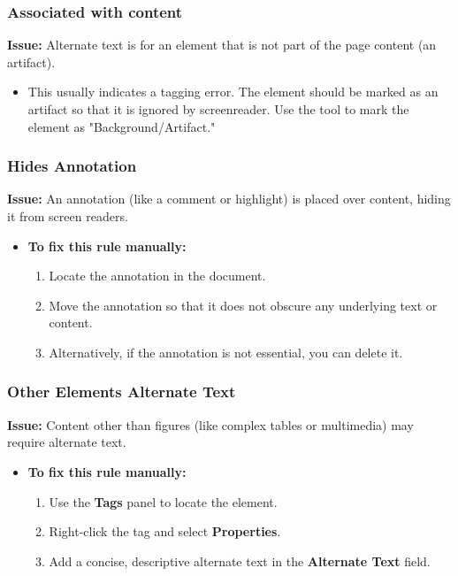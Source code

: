 \subsubsection{Associated with content}
\label{ssubsec:pdf-alt-text-associated}

\textbf{Issue:} Alternate text is for an element that is not part of the page content (an artifact).

\begin{itemize}
	\item This usually indicates a tagging error. The element should be marked as an artifact so that it is ignored by \gls{screenreader}. Use the  tool to mark the element as "Background/Artifact."
\end{itemize}

\subsubsection{Hides Annotation}
\label{ssubsec:pdf-hides-annotation}

\textbf{Issue:} An annotation (like a comment or highlight) is placed over content, hiding it from screen readers.

\begin{itemize}
	\item \textbf{To fix this rule manually:}
	      \begin{enumerate}
		      \item Locate the annotation in the document.
		      \item Move the annotation so that it does not obscure any underlying text or content.
		      \item Alternatively, if the annotation is not essential, you can delete it.
	      \end{enumerate}
\end{itemize}

\subsubsection{Other Elements Alternate Text}
\label{ssubsec:pdf-other-elements-alt-text}

\textbf{Issue:} Content other than figures (like complex tables or multimedia) may require alternate text.

\begin{itemize}
	\item \textbf{To fix this rule manually:}
	      \begin{enumerate}
		      \item Use the \textbf{Tags} panel to locate the element.
		      \item Right-click the tag and select \textbf{Properties}.
		      \item Add a concise, descriptive alternate text in the \textbf{Alternate Text} field.
	      \end{enumerate}
\end{itemize}

